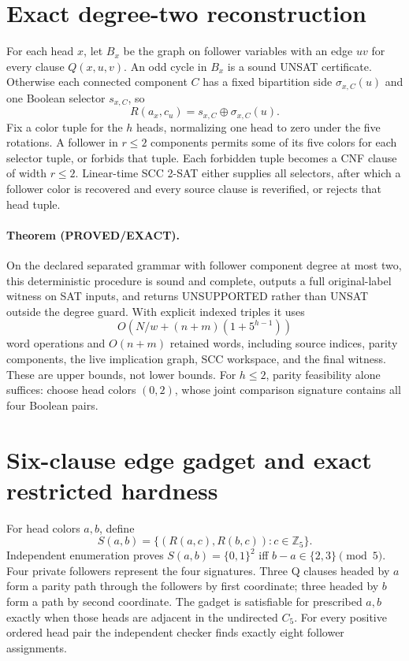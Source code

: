 \documentclass[11pt]{article}
\begin{document}
\section{Exact degree-two reconstruction}
For each head $x$, let $B_x$ be the graph on follower variables with an edge $uv$ for every clause $Q(x,u,v)$.  An odd cycle in $B_x$ is a sound UNSAT certificate.  Otherwise each connected component $C$ has a fixed bipartition side $\sigma_{x,C}(u)$ and one Boolean selector $s_{x,C}$, so
\[
 R(a_x,c_u)=s_{x,C}\oplus\sigma_{x,C}(u).
\]
Fix a color tuple for the $h$ heads, normalizing one head to zero under the five rotations.  A follower in $r\le2$ components permits some of its five colors for each selector tuple, or forbids that tuple.  Each forbidden tuple becomes a CNF clause of width $r\le2$.  Linear-time SCC 2-SAT either supplies all selectors, after which a follower color is recovered and every source clause is reverified, or rejects that head tuple.

\paragraph{Theorem (PROVED/EXACT).}
On the declared separated grammar with follower component degree at most two, this deterministic procedure is sound and complete, outputs a full original-label witness on SAT inputs, and returns UNSUPPORTED rather than UNSAT outside the degree guard.  With explicit indexed triples it uses
\[
 O\!\left(N/w+(n+m)(1+5^{h-1})\right)
\]
word operations and $O(n+m)$ retained words, including source indices, parity components, the live implication graph, SCC workspace, and the final witness.  These are upper bounds, not lower bounds.  For $h\le2$, parity feasibility alone suffices: choose head colors $(0,2)$, whose joint comparison signature contains all four Boolean pairs.

\section{Six-clause edge gadget and exact restricted hardness}
For head colors $a,b$, define
\[
S(a,b)=\{(R(a,c),R(b,c)):c\in\mathbb Z_5\}.
\]
Independent enumeration proves $S(a,b)=\{0,1\}^2$ iff $b-a\in\{2,3\}\pmod5$.  Four private followers represent the four signatures.  Three Q clauses headed by $a$ form a parity path through the followers by first coordinate; three headed by $b$ form a path by second coordinate.  The gadget is satisfiable for prescribed $a,b$ exactly when those heads are adjacent in the undirected $C_5$.  For every positive ordered head pair the independent checker finds exactly eight follower assignments.
\end{document}
